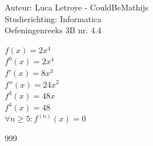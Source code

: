 \documentclass[a4paper]{article}
\begin{document}
  
\noindent \large Auteur: Luca Letroye -  CouldBeMathijs \\
\noindent \large Studierichting: Informatica\\
\noindent \large Oefeningenreeks 3B nr. 4.4\\

\medskip

\normalsize

$f(x) = 2x^4$\\

$f^0(x) = 2x^4$\\

$f'(x) = 8x^3$\\

$f''(x) = 24x^2$\\

$f^3(x) = 48x$\\

$f^4(x) = 48$\\

$\forall n \ge 5 : f^{(n)}(x) = 0$

\begin{thebibliography}{999}
\end{thebibliography}
\end{document}
